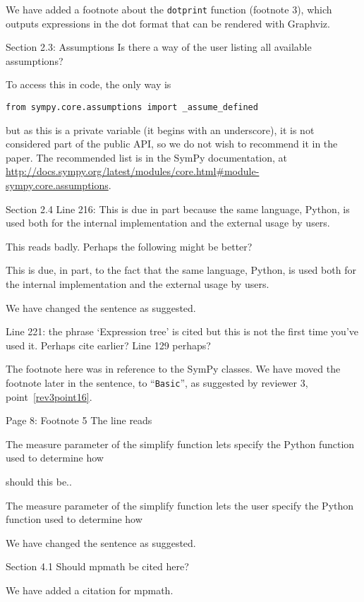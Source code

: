 \documentclass[answers,12pt]{exam}
\begin{document}
\begin{questions}
\begin{solution}
We have added a footnote about the \texttt{dotprint} function (footnote 3),
which outputs expressions in the dot format that can be rendered with Graphviz.
\end{solution}

\question Section 2.3: Assumptions
Is there a way of the user listing all available assumptions?

\begin{solution}
  To access this in code, the only way is
\begin{verbatim}
from sympy.core.assumptions import _assume_defined
\end{verbatim}
  but as this is a private variable (it begins with an underscore), it is not
  considered part of the public API, so we do not wish to recommend it in the
  paper. The recommended list is in the SymPy documentation, at
  \url{http://docs.sympy.org/latest/modules/core.html#module-sympy.core.assumptions}.
\end{solution}
\question Section 2.4
Line 216: This is due in part because the same language, Python, is used both for the internal implementation and the external usage by users.

This reads badly. Perhaps the following might be better?

This is due, in part, to the fact that the same language, Python, is used both for the internal implementation and the external usage by users.

\begin{solution}
We have changed the sentence as suggested.
\end{solution}
\question Line 221:
the phrase `Expression tree' is cited but this is not the first time you've used it. Perhaps cite earlier? Line 129 perhaps?

\begin{solution}
The footnote here was in reference to the SymPy classes. We have moved the
footnote later in the sentence, to ``\texttt{Basic}'', as suggested
by reviewer 3, point~\ref{rev3point16}.
\end{solution}
\question Page 8: Footnote 5
The line reads

The measure parameter of the simplify function lets specify the Python function used to determine how

should this be..

The measure parameter of the simplify function lets the user specify the Python function used to determine how

\begin{solution}
We have changed the sentence as suggested.
\end{solution}
\question Section 4.1
Should mpmath be cited here?

\begin{solution}
We have added a citation for mpmath.
\end{solution}
\end{questions}
\end{document}
